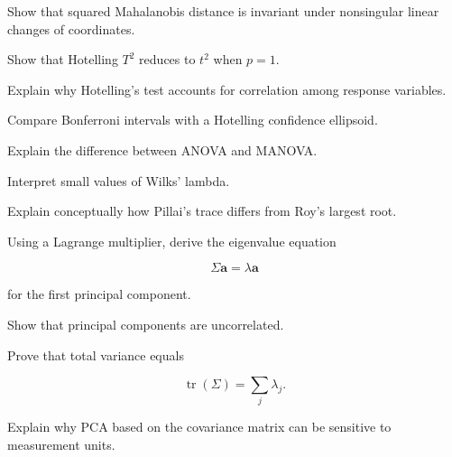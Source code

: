 \begin{exercise}[3]
Show that squared Mahalanobis distance is invariant under nonsingular
linear changes of coordinates.
\end{exercise}

\begin{exercise}[3]
Show that Hotelling \(T^2\) reduces to \(t^2\) when \(p=1\).
\end{exercise}

\begin{exercise}[3]
Explain why Hotelling's test accounts for correlation among response
variables.
\end{exercise}

\begin{exercise}[3]
Compare Bonferroni intervals with a Hotelling confidence ellipsoid.
\end{exercise}

\begin{exercise}[3]
Explain the difference between ANOVA and MANOVA.
\end{exercise}

\begin{exercise}[3]
Interpret small values of Wilks' lambda.
\end{exercise}

\begin{exercise}[3]
Explain conceptually how Pillai's trace differs from Roy's largest root.
\end{exercise}

\begin{exercise}[3]
Using a Lagrange multiplier, derive the eigenvalue equation

\[
\Sigma\mathbf{a}
=
\lambda\mathbf{a}
\]

for the first principal component.
\end{exercise}

\begin{exercise}[3]
Show that principal components are uncorrelated.
\end{exercise}

\begin{exercise}[3]
Prove that total variance equals

\[
\operatorname{tr}(\Sigma)
=
\sum_j\lambda_j.
\]
\end{exercise}

\begin{exercise}[3]
Explain why PCA based on the covariance matrix can be sensitive to
measurement units.
\end{exercise}


